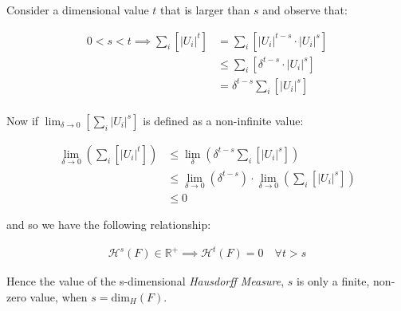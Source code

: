 \documentclass[a4paper,11pt,twoside]{article}
\begin{document}
Consider a dimensional value \(t\) that is larger than  \(s\) and observe that:

\begin{align*}
0<s<t  \implies   \sum_{i}  \left[ \left\lvert U_i \right\rvert^t \right] &= \sum_{i}\left[ \left\lvert U_i \right\rvert^{t- s} \cdot  \left\lvert U_i \right\rvert^s \right] \\
&\leq \sum_{i} \left[ \delta^{t - s} \cdot \left\lvert U_i \right\rvert^s  \right]    \\
&= \delta^{t- s}\sum_{i}   \left[ \left\lvert U_i \right\rvert^s \right] 									   \\
\end{align*}

Now if \(\lim_{\delta \rightarrow 0}\left[ \sum_{i}   \left\lvert U_i \right\rvert^s \right]\) is defined as a non-infinite value:

\begin{align}
    \lim_{\delta \rightarrow 0} \left( \sum_{i}   \left[ \left\lvert U_i \right\rvert^t \right]  \right) & \leq \lim_{\delta}\left( \delta^{t- s} \sum_{i}   \left[ \left\lvert U_i \right\rvert^s \right]  \right) \\
&\leq \lim_{\delta \rightarrow 0}\left( \delta^{t - s} \right) \cdot  \lim_{\delta \rightarrow 0}\left( \sum_{i} \left[ \left\lvert U_i \right\rvert^s \right]    \right) \\
&\leq 0
\end{align}

and so we have the following relationship:

\begin{align}
    \mathcal{H}^{s} \left(F\right) \in \mathbb{R}^{+}  \implies  \mathcal{H}^t\left( F \right)= 0 \quad \forall t > s \label{eq:hdfzero}
\end{align}

Hence the value of the s-dimensional \emph{Hausdorff Measure}, \(s\) is only a finite, non-zero value, when \(s = \mathrm{dim}_{H}\left( F \right)\).
\end{document}
